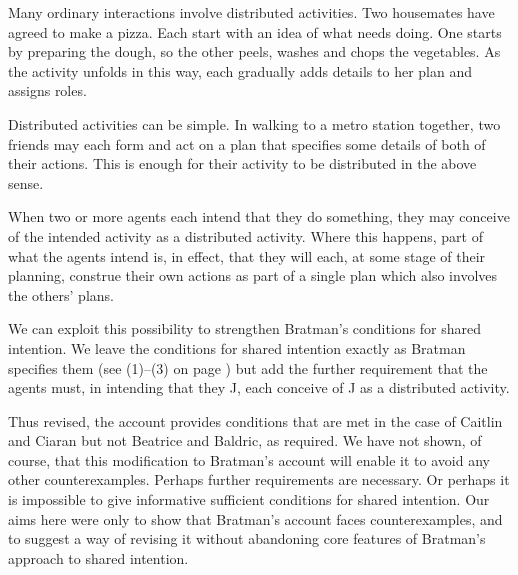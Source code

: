 \documentclass[12pt,\papersize]{extarticle}
\begin{document}
Many ordinary interactions involve distributed activities.
Two housemates have agreed to make a pizza. 
Each start with an idea of what needs doing.
One starts by preparing the dough, so the other peels, washes and chops the vegetables.
As the activity unfolds in this way, each gradually adds details to her plan and assigns roles. 

Distributed activities can be simple.
In walking to a metro station together,
two friends may each form and act on a plan that specifies some details of both of their actions.
This is enough for their activity to be distributed in the above sense.

When two or more agents each intend that they do something, 
they may conceive of the intended activity as a distributed activity.
Where this happens, part of what the agents intend is, in effect, that they will each, at some stage of their planning, construe their own actions as part of a single plan which also involves the others' plans.

We can exploit this possibility %
to strengthen Bratman's conditions for shared intention.
We leave the conditions for shared intention exactly as Bratman specifies them (see (1)--(3) on page \pageref{quote:bratman_account})
but add the further requirement that the agents must, in intending that they J, each conceive of J as a distributed activity.

Thus revised, the account provides conditions that are met in the case of Caitlin and Ciaran but not Beatrice and Baldric, as required.
We have not shown, of course, that this modification to Bratman's account will enable it to avoid any other counterexamples.
Perhaps further requirements are necessary.
Or perhaps it is impossible to give informative sufficient conditions for shared intention.
Our aims here were only 
		to show that Bratman's account faces counterexamples,
	and 
		to suggest a way of revising it without abandoning core features of Bratman's approach to shared intention.
		
\end{document}
